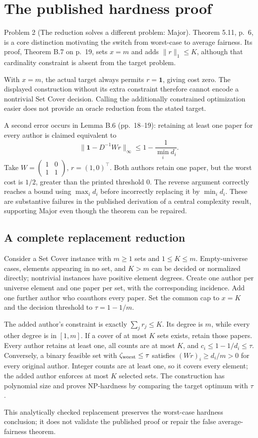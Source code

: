\documentclass[10pt]{article}
\begin{document}
\section*{The published hardness proof}
Problem 2 (The reduction solves a different problem: Major).  Theorem 5.11, p. 6, is a core distinction motivating the switch from worst-case to average fairness. Its proof, Theorem B.7 on p. 19, sets \(x=m\) and adds \(\|r\|_1\le K\), although that cardinality constraint is absent from the target problem.\par
With \(x=m\), the actual target always permits \(r=\mathbf1\), giving cost zero. The displayed construction without its extra constraint therefore cannot encode a nontrivial Set Cover decision. Calling the additionally constrained optimization easier does not provide an oracle reduction from the stated target.\par
A second error occurs in Lemma B.6 (pp. 18–19): retaining at least one paper for every author is claimed equivalent to \[\| \mathbf1-D^{-1}Wr\|_\infty\le1-\frac1{\min_i d_i}.\] Take \(W=\left(\begin{smallmatrix}1&0\\1&1\end{smallmatrix}\right)\), \(r=(1,0)^\top\). Both authors retain one paper, but the worst cost is \(1/2\), greater than the printed threshold \(0\). The reverse argument correctly reaches a bound using \(\max_i d_i\) before incorrectly replacing it by \(\min_i d_i\). These are substantive failures in the published derivation of a central complexity result, supporting Major even though the theorem can be repaired.\par
\subsection*{A complete replacement reduction}
Consider a Set Cover instance with \(m\ge1\) sets and \(1\le K\le m\). Empty-universe cases, elements appearing in no set, and \(K>m\) can be decided or normalized directly; nontrivial instances have positive element degrees. Create one author per universe element and one paper per set, with the corresponding incidence. Add one further author who coauthors every paper. Set the common cap to \(x=K\) and the decision threshold to \(\tau=1-1/m\).\par
The added author’s constraint is exactly \(\sum_j r_j\le K\). Its degree is \(m\), while every other degree is in \([1,m]\). If a cover of at most \(K\) sets exists, retain those papers. Every author retains at least one, all counts are at most \(K\), and \(c_i\le1-1/d_i\le\tau\). Conversely, a binary feasible set with \(\zeta_{\rm worst}\le\tau\) satisfies \((Wr)_i\ge d_i/m>0\) for every original author. Integer counts are at least one, so it covers every element; the added author enforces at most \(K\) selected sets. The construction has polynomial size and proves NP-hardness by comparing the target optimum with \(\tau\).\par
This analytically checked replacement preserves the worst-case hardness conclusion; it does not validate the published proof or repair the false average-fairness theorem.\par
\end{document}

